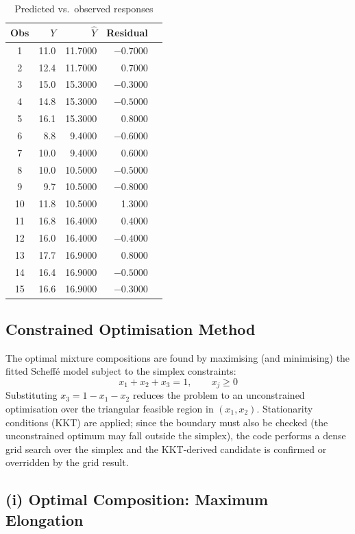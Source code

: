 \documentclass[12pt,a4paper]{article}
\begin{document}
\begin{table}[H]
\centering
\caption{Predicted vs.\ observed responses}
\begin{tabular}{crrrr}
\toprule
Obs & $Y$ & $\hat{Y}$ & Residual \\
\midrule
 1 & 11.0 & 11.7000 & $-0.7000$ \\
 2 & 12.4 & 11.7000 &  0.7000  \\
 3 & 15.0 & 15.3000 & $-0.3000$ \\
 4 & 14.8 & 15.3000 & $-0.5000$ \\
 5 & 16.1 & 15.3000 &  0.8000  \\
 6 &  8.8 &  9.4000 & $-0.6000$ \\
 7 & 10.0 &  9.4000 &  0.6000  \\
 8 & 10.0 & 10.5000 & $-0.5000$ \\
 9 &  9.7 & 10.5000 & $-0.8000$ \\
10 & 11.8 & 10.5000 &  1.3000  \\
11 & 16.8 & 16.4000 &  0.4000  \\
12 & 16.0 & 16.4000 & $-0.4000$ \\
13 & 17.7 & 16.9000 &  0.8000  \\
14 & 16.4 & 16.9000 & $-0.5000$ \\
15 & 16.6 & 16.9000 & $-0.3000$ \\
\bottomrule
\end{tabular}
\end{table}

\subsection{Constrained Optimisation Method}

The optimal mixture compositions are found by maximising (and minimising) the fitted
Scheffé model subject to the simplex constraints:
\[
  x_1 + x_2 + x_3 = 1, \qquad x_j \ge 0
\]
Substituting $x_3 = 1 - x_1 - x_2$ reduces the problem to an unconstrained
optimisation over the triangular feasible region in $(x_1, x_2)$. Stationarity
conditions (KKT) are applied; since the boundary must also be checked (the unconstrained
optimum may fall outside the simplex), the code performs a dense grid search over the
simplex and the KKT-derived candidate is confirmed or overridden by the grid result.

\subsection{(i) Optimal Composition: Maximum Elongation}
\end{document}
